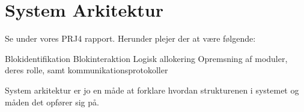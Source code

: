 \graphicspath{{Chapters/SystemArkitektur/}}

\section{System Arkitektur}

Se under vores PRJ4 rapport.
Herunder plejer der at være følgende:

Blokidentifikation
Blokinteraktion
Logisk allokering
Opremsning af moduler, deres rolle, samt kommunikationsprotokoller


System arkitektur er jo en måde at forklare hvordan strukturenen i systemet og måden det opfører sig på.